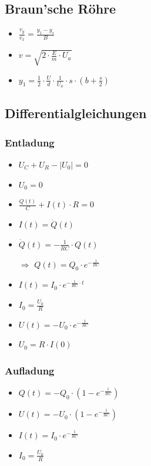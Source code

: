 \documentclass[paper = a4, twocolumn]{scrartcl}
\begin{document}
\subsection{Braun’sche Röhre}
\begin{itemize}
\item
	\( \frac{v_y}{v_x} = \frac{y_1 - y_s}{B} \)
\item
	\( v = \sqrt{2 \cdot \frac{E}{m} \cdot U_a} \)
\item
	\( y_1 = \frac{1}{2} \cdot \frac{U}{d} \cdot \frac{1}{U_a} \cdot s \cdot (b
	+ \frac{s}{2} ) \)
\end{itemize}

\subsection{Differentialgleichungen}
\subsubsection{Entladung}
\begin{itemize}
\item
	\( U_C + U_R - |U_0| = 0 \)
\item
	\( U_0 = 0 \)
\item
	\( \frac{Q(t)}{C} + I(t) \cdot R = 0 \)
\item
	\( I(t) = \dot{Q}(t) \)
\item
	\( \dot{Q}(t) = -\frac{1}{RC} \cdot Q(t) \)
\item[\(\Rightarrow\)]
	\( Q(t) = Q_0 \cdot e^{-\frac{1}{RC}} \)
\item
	\( I(t) = I_0 \cdot e^{-\frac{1}{RC} \cdot t} \)
\item
	\( I_0 = \frac{U_0}{R} \)
\item
	\( U(t) = -U_0 \cdot e^{-\frac{1}{RC}} \)
\item
	\( U_0 = R \cdot I(0) \)
\end{itemize}

\subsubsection{Aufladung}
\begin{itemize}
\item
	\( Q(t) = -Q_0 \cdot (1 - e^{-\frac{1}{RC}}) \)
\item
	\( U(t) = -U_0 \cdot (1 - e^{-\frac{1}{RC}}) \)
\item
	\( I(t) = I_0 \cdot  e^{-\frac{1}{RC}} \)
\item
	\( I_0 = \frac{U_0}{R} \)
\end{itemize}
\end{document}
